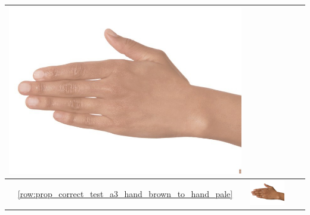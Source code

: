 \begin{longtable}{|c||c|c|c|}
\begin{minipage}{.29\textwidth}
    \includegraphics[width=\textwidth,height=\textheight,keepaspectratio]{../rc_test/outputs/20170517_proportional_corrected_test_alpha3/hand_brown_to_hand_light.jpg}
  \end{minipage} \\
  \hline  \ref{row:prop_correct_test_a3_hand_brown_to_hand_pale} &
  \begin{minipage}{.29\textwidth}
    \includegraphics[width=\textwidth,height=\textheight,keepaspectratio]{../inputs/hand_brown.jpg}
  \end{minipage} & 
  \begin{minipage}{.29\textwidth}

\end{minipage}
\end{longtable}
